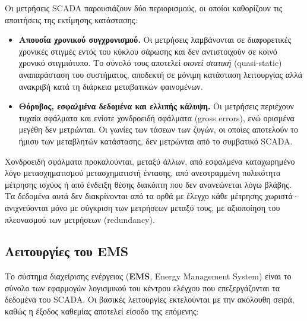 Οι μετρήσεις SCADA παρουσιάζουν δύο περιορισμούς, οι οποίοι καθορίζουν τις απαιτήσεις της
εκτίμησης κατάστασης:

\begin{itemize}
\item \textbf{Απουσία χρονικού συγχρονισμού.} Οι μετρήσεις λαμβάνονται σε διαφορετικές
      χρονικές στιγμές εντός του κύκλου σάρωσης και δεν αντιστοιχούν σε κοινό χρονικό
      στιγμιότυπο. Το σύνολό τους αποτελεί \emph{οιονεί στατική} (quasi-static)
      αναπαράσταση του συστήματος, αποδεκτή σε μόνιμη κατάσταση λειτουργίας αλλά
      ανακριβή κατά τη διάρκεια μεταβατικών φαινομένων.
\item \textbf{Θόρυβος, εσφαλμένα δεδομένα και ελλιπής κάλυψη.} Οι μετρήσεις περιέχουν
      τυχαία σφάλματα και ενίοτε χονδροειδή σφάλματα (gross errors), ενώ ορισμένα μεγέθη
      δεν μετρώνται. Οι γωνίες των τάσεων των ζυγών, οι οποίες αποτελούν το ήμισυ των
      μεταβλητών κατάστασης, δεν μετρώνται από το συμβατικό SCADA.
\end{itemize}

Χονδροειδή σφάλματα προκαλούνται, μεταξύ άλλων, από εσφαλμένα καταχωρημένο λόγο
μετασχηματισμού μετασχηματιστή έντασης, από ανεστραμμένη πολικότητα μέτρησης ισχύος ή από
ένδειξη θέσης διακόπτη που δεν ανανεώνεται λόγω βλάβης. Τα δεδομένα αυτά δεν διακρίνονται
από τα ορθά με έλεγχο κάθε μέτρησης χωριστά· ανιχνεύονται μόνο με σύγκριση των μετρήσεων
μεταξύ τους, με αξιοποίηση του πλεονασμού των μετρήσεων (redundancy).

\subsection{Λειτουργίες του EMS}

Το σύστημα διαχείρισης ενέργειας (\textbf{EMS}, Energy Management System) είναι το σύνολο των
εφαρμογών λογισμικού του κέντρου ελέγχου που επεξεργάζονται τα δεδομένα του SCADA. Οι
βασικές λειτουργίες εκτελούνται με την ακόλουθη σειρά, καθώς η έξοδος καθεμίας αποτελεί
είσοδο της επόμενης:

